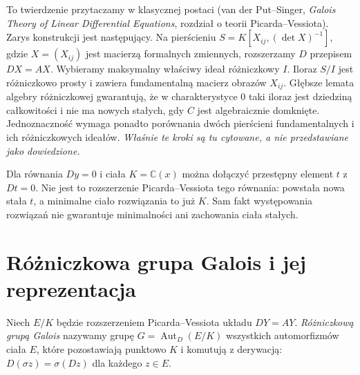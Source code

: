 \begin{uwaga}
\label{aa:uw:pv-existence-cited}
To twierdzenie przytaczamy w klasycznej
postaci (van der Put--Singer,
\emph{Galois Theory of Linear Differential
Equations}, rozdział o teorii
Picarda--Vessiota).
Zarys konstrukcji jest następujący.
Na pierścieniu
$S=K[X_{ij},(\det X)^{-1}]$,
gdzie $X=(X_{ij})$ jest macierzą
formalnych zmiennych, rozszerzamy $D$
przepisem $DX=AX$.
Wybieramy maksymalny właściwy
ideał różniczkowy $I$.
Iloraz $S/I$ jest różniczkowo prosty
i zawiera fundamentalną macierz
obrazów $X_{ij}$.
Głębsze lemata algebry różniczkowej
gwarantują, że w charakterystyce
$0$ taki iloraz jest dziedziną
całkowitości i nie ma nowych stałych,
gdy $C$ jest algebraicznie domknięte.
Jednoznaczność wymaga ponadto
porównania dwóch pierścieni
fundamentalnych i ich
różniczkowych ideałów.
\emph{Właśnie te kroki są tu cytowane,
a nie przedstawiane jako dowiedzione.}
\end{uwaga}

\begin{uwaga}
\label{aa:uw:pv-new-constants}
Dla równania $Dy=0$ i ciała
$K=\mathbb C(x)$ można dołączyć
przestępny element $t$ z $Dt=0$.
Nie jest to rozszerzenie
Picarda--Vessiota tego równania:
powstała nowa stała $t$, a
minimalne ciało rozwiązania to
już $K$. Sam fakt występowania
rozwiązań nie gwarantuje minimalności
ani zachowania ciała stałych.
\end{uwaga}

\section{Różniczkowa grupa Galois i jej reprezentacja}

\begin{definicja}
\label{aa:def:pv-group}
Niech $E/K$ będzie rozszerzeniem
Picarda--Vessiota układu $DY=AY$.
\emph{Różniczkową grupą Galois}
nazywamy grupę
$G=\operatorname{Aut}_D(E/K)$
wszystkich automorfizmów ciała $E$,
które pozostawiają punktowo $K$
i komutują z derywacją:
$D(\sigma z)=\sigma(Dz)$
dla każdego $z\in E$.
\end{definicja}

